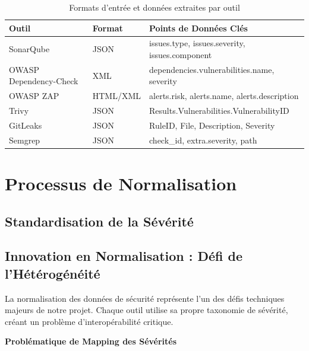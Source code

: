 \documentclass[12pt,a4paper]{report}
\begin{document}
\begin{table}[H]
    \centering
    \begin{tabularx}{\textwidth}{|X|X|X|}
        \hline
        \textbf{Outil} & \textbf{Format} & \textbf{Points de Données Clés} \\
        \hline
        SonarQube & JSON & issues.type, issues.severity, issues.component \\
        \hline
        OWASP Dependency-Check & XML & dependencies.vulnerabilities.name, severity \\
        \hline
        OWASP ZAP & HTML/XML & alerts.risk, alerts.name, alerts.description \\
        \hline
        Trivy & JSON & Results.Vulnerabilities.VulnerabilityID \\
        \hline
        GitLeaks & JSON & RuleID, File, Description, Severity \\
        \hline
        Semgrep & JSON & check\_id, extra.severity, path \\
        \hline
    \end{tabularx}
    \caption{Formats d'entrée et données extraites par outil}
\end{table}

\section{Processus de Normalisation}

\subsection{Standardisation de la Sévérité}

\subsection{Innovation en Normalisation : Défi de l'Hétérogénéité}

La normalisation des données de sécurité représente l'un des défis techniques majeurs de notre projet. Chaque outil utilise sa propre taxonomie de sévérité, créant un problème d'interopérabilité critique.

\textbf{Problématique de Mapping des Sévérités}
\end{document}
